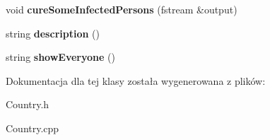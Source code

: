\begin{DoxyCompactItemize}
\item 
void {\bfseries cure\+Some\+Infected\+Persons} (fstream \&output)\hypertarget{classCountry_a87a885d659d7e47e405d5d445fd4f0ee}{}\label{classCountry_a87a885d659d7e47e405d5d445fd4f0ee}

\item 
string {\bfseries description} ()\hypertarget{classCountry_a15d7e9b23f141f837fec76cedd76683b}{}\label{classCountry_a15d7e9b23f141f837fec76cedd76683b}

\item 
string {\bfseries show\+Everyone} ()\hypertarget{classCountry_a167fa855a40dd3bb0274ee8c01c994c8}{}\label{classCountry_a167fa855a40dd3bb0274ee8c01c994c8}

\end{DoxyCompactItemize}


Dokumentacja dla tej klasy została wygenerowana z plików\+:\begin{DoxyCompactItemize}
\item 
Country.\+h\item 
Country.\+cpp\end{DoxyCompactItemize}
